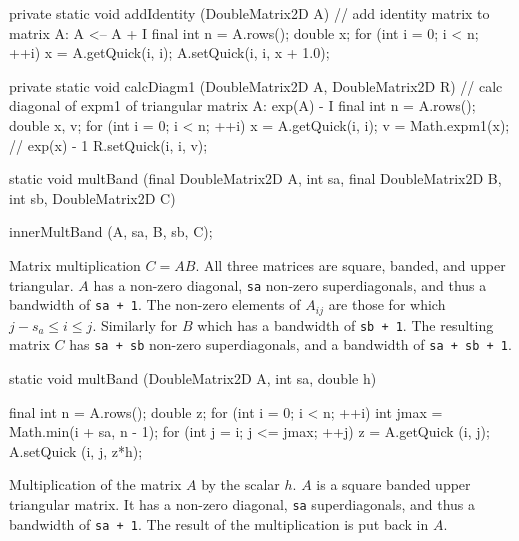 \begin{hide}
\begin{code}

   private static void addIdentity (DoubleMatrix2D A) {
      // add identity matrix to matrix A:  A <-- A + I
      final int n = A.rows();
      double x;
      for (int i = 0; i < n; ++i) {
         x = A.getQuick(i, i);
         A.setQuick(i, i, x + 1.0);
      }
   }


   private static void calcDiagm1 (DoubleMatrix2D A, DoubleMatrix2D R) {
      // calc diagonal of expm1 of triangular matrix A:  exp(A) - I
      final int n = A.rows();
      double x, v;
      for (int i = 0; i < n; ++i) {
         x = A.getQuick(i, i);
         v = Math.expm1(x);      // exp(x) - 1
         R.setQuick(i, i, v);
      }
   }


   static void multBand (final DoubleMatrix2D A, int sa,
                         final DoubleMatrix2D B, int sb,
                         DoubleMatrix2D C) \begin{hide} {
      innerMultBand (A, sa, B, sb, C);
   } \end{hide}
\end{code}
\begin{tabb} Matrix multiplication $C = AB$. All three matrices are square,
banded, and upper triangular. $A$ has a non-zero diagonal, \texttt{sa} non-zero
 superdiagonals, and thus a bandwidth of \texttt{sa + 1}.
The non-zero elements of $A_{ij}$ are those for which $j - s_a \le i \le j$.
Similarly for $B$ which has a bandwidth of \texttt{sb + 1}.
The resulting matrix $C$ has \texttt{sa + sb} non-zero superdiagonals, and a
bandwidth of \texttt{sa + sb + 1}.
\end{tabb}
\begin{htmlonly}
\end{htmlonly}
\begin{code}

   static void multBand (DoubleMatrix2D A, int sa, double h) \begin{hide} {
      final int n = A.rows();
      double z;
      for (int i = 0; i < n; ++i) {
         int jmax = Math.min(i + sa, n - 1);
         for (int j = i; j <= jmax; ++j) {
            z = A.getQuick (i, j);
            A.setQuick (i, j, z*h);
         }
      }
   } \end{hide}
\end{code}
\begin{tabb} Multiplication of the matrix $A$ by the scalar $h$.
$A$ is a square banded upper triangular matrix. It has a non-zero diagonal,
\texttt{sa} superdiagonals, and thus a bandwidth of \texttt{sa + 1}.
The result of the multiplication is put back in $A$.
\end{tabb}
\begin{htmlonly}
\end{htmlonly}
\begin{code}


\end{code}
\end{hide}
